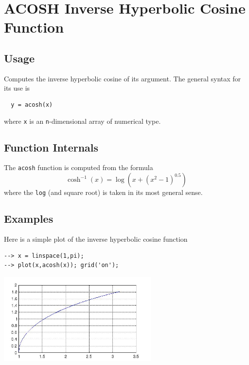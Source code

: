 \section{ACOSH Inverse Hyperbolic Cosine Function}

\subsection{Usage}

Computes the inverse hyperbolic cosine of its argument.  The general
syntax for its use is
\begin{verbatim}
  y = acosh(x)
\end{verbatim}
where \verb|x| is an \verb|n|-dimensional array of numerical type.
\subsection{Function Internals}

The \verb|acosh| function is computed from the formula
\[
   \cosh^{-1}(x) = \log\left(x + (x^2 - 1)^0.5\right)
\]
where the \verb|log| (and square root) is taken in its most general sense.
\subsection{Examples}

Here is a simple plot of the inverse hyperbolic cosine function
\begin{verbatim}
--> x = linspace(1,pi);
--> plot(x,acosh(x)); grid('on');
\end{verbatim}


\centerline{\includegraphics[width=8cm]{acoshplot}}

